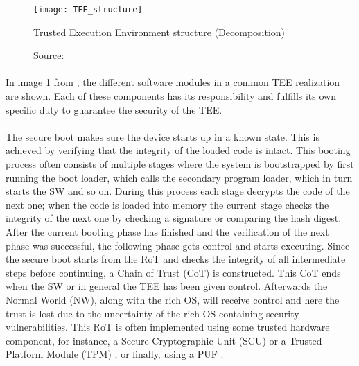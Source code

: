 \begin{figure}[h]
\centering
\texttt{[image: TEE\_structure]}
\caption{Trusted Execution Environment structure (Decomposition)}
\caption*{Source: \cite{SabtMohamed2015TEEW}}
\label{TEE}
\end{figure}

\paragraph*{}
In image \ref{TEE} from \cite{SabtMohamed2015TEEW}, the different software modules in a common TEE realization are shown. Each of these components has its responsibility and fulfills its own specific duty to guarantee the security of the TEE. 

\paragraph*{}
The secure boot makes sure the device starts up in a known state. This is achieved by verifying that the integrity of the loaded code is intact. This booting process often consists of multiple stages where the system is bootstrapped by first running the boot loader, which calls the secondary program loader, which in turn starts the SW and so on. During this process each stage decrypts the code of the next one; when the code is loaded into memory the current stage checks the integrity of the next one by checking a signature or comparing the hash digest. After the current booting phase has finished and the verification of the next phase was successful, the following phase gets control and starts executing. Since the secure boot starts from the RoT and checks the integrity of all intermediate steps before continuing, a Chain of Trust (CoT) is constructed. This CoT ends when the SW or in general the TEE has been given control. Afterwards the Normal World (NW), along with the rich OS, will receive control and here the trust is lost due to the uncertainty of the rich OS containing security vulnerabilities. This RoT is often implemented using some trusted hardware component, for instance, a Secure Cryptographic Unit (SCU) \cite{MATSUMOTOTsutomu2021SCUa} or a Trusted Platform Module (TPM) \cite{FotiadisGeorgios2021RAfS}, or finally, using a PUF \cite{ZhaoShijun2021RoRo}.

